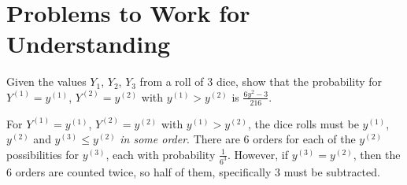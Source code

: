 \documentclass[12pt]{article}
\begin{document}

\hr

\section*{Problems to Work for Understanding}
\renewcommand{\theexerciseseries}{}
\renewcommand{\theexercise}{\arabic{exercise}}

\begin{exercise}
    Given the values \( Y_1 \), \( Y_2 \), \( Y_3 \) from a roll of \( 3
    \) dice, show that the probability for \( Y^{(1)} = y^{(1)} \), \( Y^
    {(2)} = y^{(2)} \) with \( y^{(1)} > y^{(2)} \) is \( \frac{6y^2 - 3}
    {216} \).
\end{exercise}
\begin{solution}
    For \( Y^{(1)} = y^{(1)} \), \( Y^{(2)} = y^{(2)} \) with \( y^{(1)}
    > y^{(2)} \), the dice rolls must be \( y^{(1)} \), \( y^{(2)} \)
    and \( y^{(3)} \le y^{(2)} \) \emph{in some order}.  There are \( 6 \)
    orders for each of the \( y^{(2)} \) possibilities for \( y^{(3)} \),
    each with probability \( \frac{1}{6^3} \).  However, if \( y^{(3)} =
    y^{(2)} \), then the \( 6 \) orders are counted twice, so half of
    them, specifically \( 3 \) must be subtracted.
\end{solution}
\end{document}

